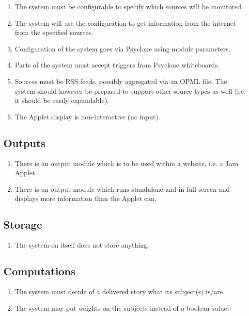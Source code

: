 \begin{enumerate}
  \item The system must be configurable to specify which sources will be
        monitored.
  \item The system will use the configuration to get information from the
        internet from the specified sources.
  \item Configuration of the system goes via Psyclone using module parameters.
  \item Parts of the system must accept triggers from Psyclone whiteboards.
  \item Sources must be \ac{RSS} feeds, possibly aggregated via an \ac{OPML}
    file. The system should however be prepared to support other source types
    as well (i.e. it should be easily expandable).
  \item The Applet display is non-interactive (no input).
\end{enumerate}

\subsection{Outputs}

\begin{enumerate}
  \item There is an output module which is to be used within a website,
        i.e. a Java Applet.
  \item There is an output module which runs standalone and in full screen
        and displays more information than the Applet can.
\end{enumerate}

\subsection{Storage}

\begin{enumerate}
  \item The system on itself does not store anything.
\end{enumerate}

\subsection{Computations}

\begin{enumerate}
  \item The system must decide of a delivered story what its subject(s) is/are.
  \item The system may put weights on the subjects instead of a boolean value.
\end{enumerate}

